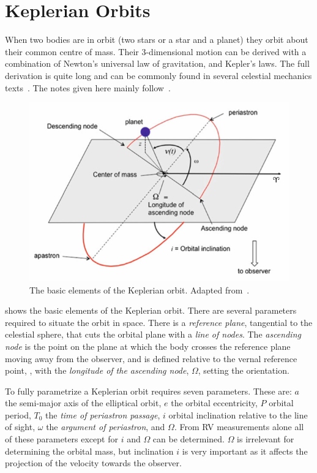 
\section{Keplerian Orbits}

When two bodies are in orbit (two stars or a star and a planet) they orbit about their common centre of mass.
Their 3-dimensional motion can be derived with a combination of Newton's universal law of gravitation, and Kepler's laws.
The full derivation is quite long and can be commonly found in several celestial mechanics texts~\citep[e.g.][]{moulton_introduction_1914, perryman_exoplanet_2011, fitzpatrick_introduction_2012}.
The notes given here mainly follow~\citet{bozza_methods_2016}.

\begin{figure}
    \centering
    \includegraphics[width=0.6\linewidth]{figures/fundamental_rv/orbit_diagram2.pdf}
    \caption[The basic elements of the Keplerian orbit.]{The basic elements of the Keplerian orbit. Adapted from~\citet{bozza_methods_2016}.}
    \label{fig:orbitdiagram}
\end{figure}

 shows the basic elements of the Keplerian orbit.
There are several parameters required to situate the orbit in space.
There is a \textit{reference plane}, tangential to the celestial sphere, that cuts the orbital plane with a \textit{line of nodes}.
The \textit{ascending node} is the point on the plane at which the body crosses the reference plane moving away from the observer, and is defined relative to the vernal reference point, \Aries, with the \textit{longitude of the ascending node}, $\Omega$, setting the orientation.

To fully parametrize a Keplerian orbit requires seven parameters.
These are: $a$ the semi-major axis of the elliptical orbit, $e$ the orbital eccentricity, $P$ orbital period, $T_0$ the \emph{time of periastron passage}, $i$ orbital inclination relative to the line of sight, $\omega$ the \emph{argument of periastron}, and $\Omega$.
From RV measurements alone all of these parameters except for $i$ and $\Omega$ can be determined.
$\Omega$ is irrelevant for determining the orbital mass, but inclination $i$ is very important as it affects the projection of the velocity towards the observer.

